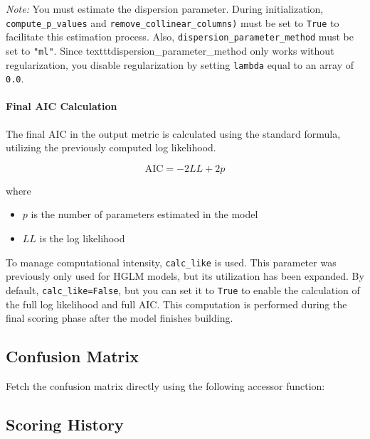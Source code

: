 \emph{Note:} You must estimate the dispersion parameter. During initialization, \texttt{compute\_p\_values} and \texttt{remove\_collinear\_columns)} must be set to \texttt{True} to facilitate this estimation process. Also, \texttt{dispersion\_parameter\_method} must be set to \texttt{"ml"}. Since texttt{dispersion\_parameter\_method} only works without regularization, you disable regularization by setting \texttt{lambda} equal to an array of \texttt{0.0}.

\paragraph{Final AIC Calculation}

The final AIC in the output metric is calculated using the standard formula, utilizing the previously computed log likelihood.

$$\text{AIC} = -2LL + 2p$$

where

\begin{itemize}
\item $p$ is the number of parameters estimated in the model
\item $LL$ is the log likelihood
\end{itemize}

To manage computational intensity, \texttt{calc\_like} is used. This parameter was previously only used for HGLM models, but its utilization has been expanded. By default, \texttt{calc\_like=False}, but you can set it to \texttt{True} to enable the calculation of the full log likelihood and full AIC. This computation is performed during the final scoring phase after the model finishes building.

\subsection{Confusion Matrix}

Fetch the confusion matrix directly using the following accessor function:

\waterExampleInR



\waterExampleInPython


\subsection{Scoring History}

